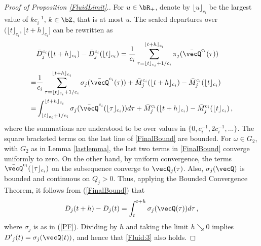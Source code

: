 \documentclass{amsart}
\begin{document}
\begin{proof}[Proof of Proposition \ref{FluidLimit}.]
For $u\in\bR_+$, denote by $\lfloor u \rfloor_{c_i}$ be the largest value of $k c_{i}^{-1}$, $k\in\bZ$, that is at most $u$.
The scaled departures over $(\lfloor t \rfloor_{c_i}, \lfloor t+h \rfloor_{c_i}]$ can be rewritten as 
\begin{align}
&\bar{D}^{c_i}_j(\lfloor t+h \rfloor_{c_i}) - \bar{D}^{c_i}_j(\lfloor t \rfloor_{c_i})\notag 
= \frac{1}{c_i}\sum_{\tau=\lfloor t \rfloor_{c_i}+1/c_i}^{\lfloor t+h \rfloor_{c_i}} \pi_j(\bar{\vecQ}^{c_i}(\tau))\notag \\
=  &\frac{1}{c_i}\sum_{\tau=\lfloor t \rfloor_{c_i}+1/c_i}^{\lfloor t+h \rfloor_{c_i}} \sigma_j(\bar{\vecQ}^{c_i}(\tau))  + \bar{M}^{c_i}_j(\lfloor t+h \rfloor_{c_i}) - \bar{M}^{c_i}_j(\lfloor t \rfloor_{c_i})\notag \\
= & \int_{\lfloor t \rfloor_{c_i} +1/c_i}^{\lfloor t+h \rfloor_{c_i}} \sigma_j(\bar{\vecQ}^{c_i}(\lfloor \tau \rfloor_{c_i}))   d \tau + \bar{M}^{c_i}_j(\lfloor t+h \rfloor_{c_i}) - \bar{M}^{c_i}_j(\lfloor t \rfloor_{c_i})
\label{FinalBound}\,,
\end{align}
where the summations are understood to be over values in $\{0,c_{i}^{-1}, 2c_{i}^{-1},...\}$.
The square bracketed terms on the last line of \eqref{FinalBound} are bounded.
For $\omega\in G_2$, with $G_2$ as in Lemma \ref{lastlemma}, the last two terms in \eqref{FinalBound} converge uniformly to zero. 
On the other hand, by uniform convergence, the terms $\bar{\vecQ}^{c_i}(\lfloor \tau \rfloor_{c_i})$ on the subsequence converge to $\vecQ_j(\tau)$. Also, $\sigma_j(\vecQ)$ is bounded and continuous on $Q_j>0$. Thus, applying the Bounded Convergence Theorem, 
it follows from (\ref{FinalBound}) that
\begin{equation*}
{D}_j(t+h) - {D}_j(t) = \int_{t}^{t+h} \sigma_j({\vecQ}(\tau))   d \tau\,,
\end{equation*}
where $\sigma_j$ is as in (\ref{PF}).
Dividing by $h$ and taking the limit $h\searrow 0$ implies $D\rq{}_j(t) = \sigma_j(\vecQ(t))$, and hence that \eqref{Fluid:3} also holds.
\end{proof}

\smallskip
\end{document}

